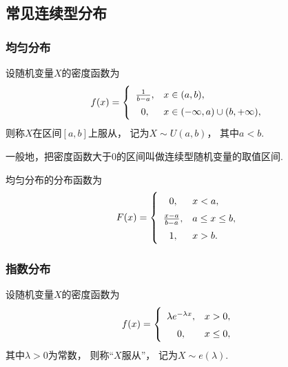 \subsection{常见连续型分布}

\subsubsection{均匀分布}
\begin{definition}
设随机变量\(X\)的密度函数为\begin{equation}
	f(x) = \left\{ \def\arraystretch{1.5}
	\begin{array}{cl}
		\frac{1}{b-a}, & x \in (a,b), \\
		0, & x \in (-\infty,a) \cup (b,+\infty), \\
	\end{array} \right.
\end{equation}
则称\(X\)在区间\([a,b]\)上服从，
记为\(X \sim U(a,b)\)，
其中\(a < b\).

一般地，把密度函数大于0的区间叫做连续型随机变量的取值区间.
\end{definition}

\begin{theorem}
均匀分布的分布函数为\begin{equation}
	F(x) = \left\{ \def\arraystretch{1.5}
	\begin{array}{cl}
		0, & x < a, \\
		\frac{x-a}{b-a}, & a \leq x \leq b, \\
		1, & x > b. \\
	\end{array} \right.
\end{equation}
\end{theorem}

\subsubsection{指数分布}
\begin{definition}
设随机变量\(X\)的密度函数为\begin{equation}
f(x) = \left\{ \def\arraystretch{1.5}
\begin{array}{cl}
\lambda e^{-\lambda x}, & x > 0, \\
0, & x \leq 0, \\
\end{array} \right.
\end{equation}其中\(\lambda > 0\)为常数，
则称“\(X\)服从”，
记为\(X \sim e(\lambda)\).
\end{definition}

